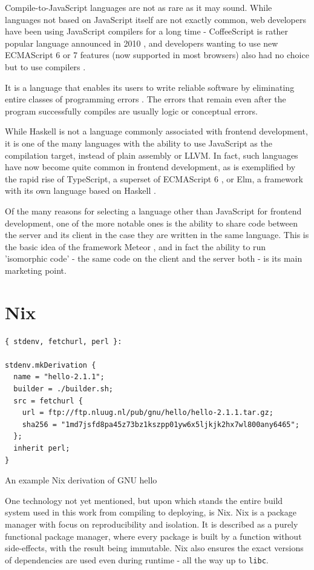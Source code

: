 \documentclass[english,odsaz]{fitthesis}
\begin{document}
Compile-to-JavaScript languages are not as rare as it may sound. While languages
not based on JavaScript itself are not exactly common, web developers have been
using JavaScript compilers for a long time - CoffeeScript is rather popular
language announced in 2010 \cite{coffeescript}, and developers wanting to use new
ECMAScript 6 or 7 features (now supported in most browsers) also had no choice
but to use compilers \cite{babel}.

It is a language that enables its users to write reliable software by
eliminating entire classes of programming errors \cite{Nanz_2015}. The errors that
remain even after the program successfully compiles are usually logic or
conceptual errors.

While Haskell is not a language commonly associated with frontend development,
it is one of the many languages with the ability to use JavaScript as the
compilation target, instead of plain assembly or LLVM. In fact, such languages
have now become quite common in frontend development, as is exemplified by the
rapid rise of TypeScript, a superset of ECMAScript 6 \cite{typescript}, or Elm, a
framework with its own language based on Haskell \cite{czaplicki2012elm}.

Of the many reasons for selecting a language other than JavaScript for frontend
development, one of the more notable ones is the ability to share code between
the server and its client in the case they are written in the same
language. This is the basic idea of the framework Meteor \cite{meteor}, and in
fact the ability to run 'isomorphic code' - the same code on the client and the
server both - is its main marketing point.

\section{Nix}
\label{sec:orgbfbba00}
\begin{listing}[htbp]
\begin{verbatim}
{ stdenv, fetchurl, perl }:

stdenv.mkDerivation {
  name = "hello-2.1.1";
  builder = ./builder.sh;
  src = fetchurl {
    url = ftp://ftp.nluug.nl/pub/gnu/hello/hello-2.1.1.tar.gz;
    sha256 = "1md7jsfd8pa45z73bz1kszpp01yw6x5ljkjk2hx7wl800any6465";
  };
  inherit perl;
}
\end{verbatim}
\caption{An example Nix derivation of GNU hello}
\end{listing}

One technology not yet mentioned, but upon which stands the entire build system
used in this work from compiling to deploying, is Nix. Nix
\cite{dolstra2006purely} is a package manager with focus on reproducibility and
isolation. It is described as a purely functional package manager, where every
package is built by a function without side-effects, with the result being
immutable. Nix also ensures the exact versions of dependencies are used even
during runtime - all the way up to \texttt{libc}.
\end{document}
